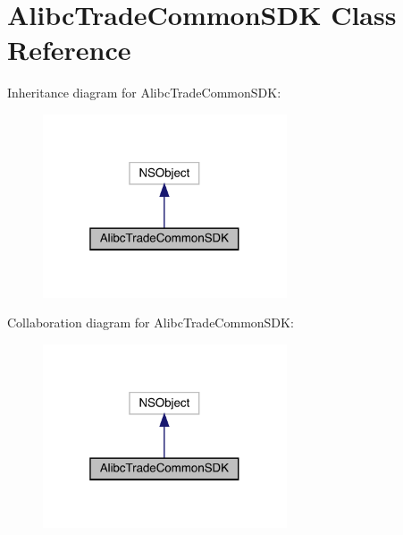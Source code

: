 \hypertarget{interface_alibc_trade_common_s_d_k}{}\section{Alibc\+Trade\+Common\+S\+DK Class Reference}
\label{interface_alibc_trade_common_s_d_k}


Inheritance diagram for Alibc\+Trade\+Common\+S\+DK\+:\nopagebreak
\begin{figure}[H]
\begin{center}
\leavevmode
\includegraphics[width=205pt]{interface_alibc_trade_common_s_d_k__inherit__graph}
\end{center}
\end{figure}


Collaboration diagram for Alibc\+Trade\+Common\+S\+DK\+:\nopagebreak
\begin{figure}[H]
\begin{center}
\leavevmode
\includegraphics[width=205pt]{interface_alibc_trade_common_s_d_k__coll__graph}
\end{center}
\end{figure}
